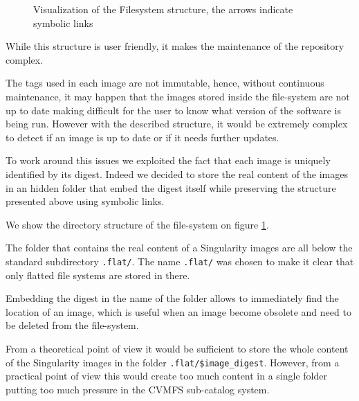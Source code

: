 \begin{figure}
\caption{Visualization of the Filesystem structure, the arrows indicate symbolic links}
\label{fig:simple-fs}
\end{figure}

While this structure is user friendly, it makes the maintenance of the
repository complex.

The tags used in each image are not immutable, hence, without continuous
maintenance, it may happen that the images stored inside the file-system are
not up to date making difficult for the user to know what version of the
software is being run.  However with the described structure, it would be
extremely complex to detect if an image is up to date or if it needs further
updates.

To work around this issues we exploited the fact that each image is uniquely
identified by its digest.  Indeed we decided to store the real content of the
images in an hidden folder that embed the digest itself while preserving the
structure presented above using symbolic links.

We show the directory structure of the file-system on figure
\ref{fig:simple-fs}.

The folder that contains the real content of a Singularity images are all below
the standard subdirectory \texttt{.flat/}.  The name \texttt{.flat/} was chosen
to make it clear that only flatted file systems are stored in there.

Embedding the digest in the name of the folder allows to immediately find the
location of an image, which is useful when an image become obsolete and need to
be deleted from the file-system.

From a theoretical point of view it would be sufficient to store the whole
content of the Singularity images in the folder \texttt{.flat/\$image\_digest}.
However, from a practical point of view this would create too much content in a
single folder putting too much pressure in the CVMFS sub-catalog system.

